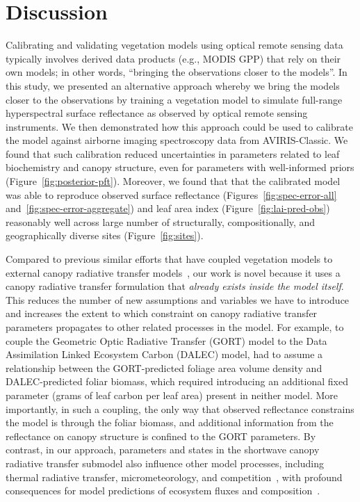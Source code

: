 \section{Discussion}

Calibrating and validating vegetation models using optical remote sensing data typically involves derived data products (e.g., MODIS GPP) that rely on their own models;
in other words, ``bringing the observations closer to the models''.
In this study, we presented an alternative approach whereby we bring the models closer to the observations by training a vegetation model to simulate full-range hyperspectral surface reflectance as observed by optical remote sensing instruments.
We then demonstrated how this approach could be used to calibrate the model against airborne imaging spectroscopy data from AVIRIS-Classic.
We found that such calibration reduced uncertainties in parameters related to leaf biochemistry and canopy structure, even for parameters with well-informed priors (Figure~\ref{fig:posterior-pft}).
Moreover, we found that that the calibrated model was able to reproduce observed surface reflectance (Figures~\ref{fig:spec-error-all} and~\ref{fig:spec-error-aggregate}) and leaf area index (Figure~\ref{fig:lai-pred-obs}) reasonably well across large number of structurally, compositionally, and geographically diverse sites (Figure~\ref{fig:sites}).

Compared to previous similar efforts that have coupled vegetation models to external canopy radiative transfer models~\citep{knorr2001assimilation, nouvellon2001coupling, quaife2008assimilating},
our work is novel because it uses a canopy radiative transfer formulation that \emph{already exists inside the model itself}.
This reduces the number of new assumptions and variables we have to introduce and increases the extent to which constraint on canopy radiative transfer parameters propagates to other related processes in the model.
For example, to couple the Geometric Optic Radiative Transfer (GORT) model to the Data Assimilation Linked Ecosystem Carbon (DALEC) model, \citet{quaife2008assimilating} had to assume a relationship between the GORT-predicted foliage area volume density and DALEC-predicted foliar biomass, which required introducing an additional fixed parameter (grams of leaf carbon per leaf area) present in neither model.
More importantly, in such a coupling, the only way that observed reflectance constrains the model is through the foliar biomass, and additional information from the reflectance on canopy structure is confined to the GORT parameters.
By contrast, in our approach, parameters and states in the shortwave canopy radiative transfer submodel also influence other model processes, including thermal radiative transfer, micrometeorology, and competition~\citep{longo2019ed2description}, with profound consequences for model predictions of ecosystem fluxes and composition~\citep{viskari_2019_influence}.

